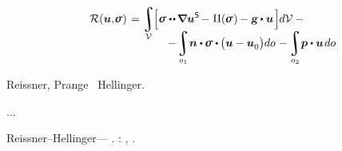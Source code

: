 \nopagebreak\vspace{-0.3em}
\begin{multline}\label{reissnerhellingervariationalprinciple}
\shoveleft{\mathcal{R}( \bm{u}, \hspace{-0.32ex} \linearstress ) \hspace{.2ex} =
\displaystyle\integral\displaylimits_{\mathcal{V}} \hspace{-0.3ex}
\Bigl[
\linearstress \dotdotp \hspace{-0.16ex} \boldnabla {\bm{u}}^{\mathsf{S}} \hspace{-0.2ex} - \hspace{.1ex} \complementaryenergydensity(\hspace{-0.1ex}\linearstress\hspace{.1ex})\hspace{-0.1ex} -
\volumeloadvector \hspace{-0.1ex} \dotp \bm{u}
\hspace{.2ex} \Bigr] \hspace{-0.1ex} d\mathcal{V} \hspace{.5ex}
- \hfill}
\\[-1.2em]
%
\hspace{8em}
- \hspace{-0.2ex} \displaystyle\integral\displaylimits_{o_1} \hspace{-0.4ex} \unitnormalvector \dotp \hspace{-0.1ex} \linearstress \dotp \hspace{-0.1ex} \bigl( \bm{u} - \bm{u}_{\raisemath{-0.1em}{0}} \bigr) do \hspace{.2ex}
- \hspace{-0.2ex} \integral\displaylimits_{o_2} \hspace{-0.4ex} \bm{p} \dotp \bm{u} \hspace{.25ex} do
\end{multline}

\nopagebreak\vspace{-0.2em}\noindent
{}  Reissner, Prange ~Hellinger.

...

 Reissner\hbox{--}Hellinger\:--- .
:  , .



